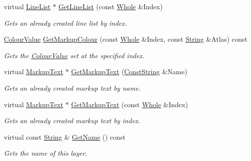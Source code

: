 \begin{DoxyCompactItemize}
virtual \hyperlink{classMezzanine_1_1UI_1_1LineList}{LineList} $\ast$ \hyperlink{classMezzanine_1_1UI_1_1Layer_a58684b937a96e2a5cb911fae520e4d1f}{GetLineList} (const \hyperlink{namespaceMezzanine_adcbb6ce6d1eb4379d109e51171e2e493}{Whole} \&Index)
\begin{DoxyCompactList}\small\item\em Gets an already created line list by index. \item\end{DoxyCompactList}\item 
\hyperlink{classMezzanine_1_1ColourValue}{ColourValue} \hyperlink{classMezzanine_1_1UI_1_1Layer_aaf942f21faf8bf18114f1465166a3dae}{GetMarkupColour} (const \hyperlink{namespaceMezzanine_adcbb6ce6d1eb4379d109e51171e2e493}{Whole} \&Index, const \hyperlink{namespaceMezzanine_acf9fcc130e6ebf08e3d8491aebcf1c86}{String} \&Atlas) const 
\begin{DoxyCompactList}\small\item\em Gets the \hyperlink{classMezzanine_1_1ColourValue}{ColourValue} set at the specified index. \item\end{DoxyCompactList}\item 
virtual \hyperlink{classMezzanine_1_1UI_1_1MarkupText}{MarkupText} $\ast$ \hyperlink{classMezzanine_1_1UI_1_1Layer_a172322ba8c4c27d5c59aa8b077e9e150}{GetMarkupText} (\hyperlink{namespaceMezzanine_a63cd699ac54b73953f35ec9cfc05e506}{ConstString} \&Name)
\begin{DoxyCompactList}\small\item\em Gets an already created markup text by name. \item\end{DoxyCompactList}\item 
virtual \hyperlink{classMezzanine_1_1UI_1_1MarkupText}{MarkupText} $\ast$ \hyperlink{classMezzanine_1_1UI_1_1Layer_a9d68b5d2587065884ec2796851e31166}{GetMarkupText} (const \hyperlink{namespaceMezzanine_adcbb6ce6d1eb4379d109e51171e2e493}{Whole} \&Index)
\begin{DoxyCompactList}\small\item\em Gets an already created markup text by index. \item\end{DoxyCompactList}\item 
virtual const \hyperlink{namespaceMezzanine_acf9fcc130e6ebf08e3d8491aebcf1c86}{String} \& \hyperlink{classMezzanine_1_1UI_1_1Layer_a599cacbb9666d0a8a3ad2fddd7157042}{GetName} () const 
\begin{DoxyCompactList}\small\item\em Gets the name of this layer. \item\end{DoxyCompactList}\item 

\end{DoxyCompactItemize}
